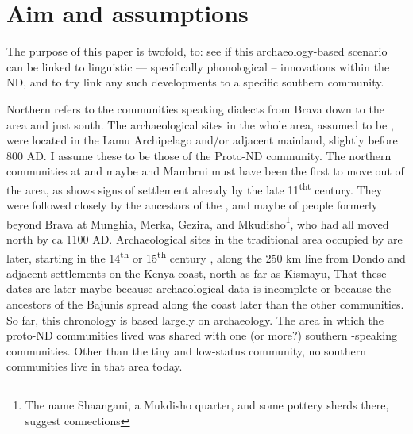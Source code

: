 \documentclass[output=paper
,newtxmath
,modfonts
,nonflat]{langsci/langscibook}
\begin{document}
\section{Aim and assumptions}\label{sec:nurse:3} 

The purpose of this paper is twofold, to: see if this archaeology-based scenario can be linked to linguistic --- specifically phonological -- innovations within the ND, and to try link any such developments to a specific southern  community. 

Northern  refers to the communities speaking  dialects from Brava down to the  area and just south. The archaeological sites in the whole area, assumed to be , were located in the Lamu Archipelago and/or adjacent mainland, slightly before 800 AD. I assume these to be those of the Proto-ND community. The northern communities at  and maybe  and Mambrui must have been the first to move out of the area, as  shows signs of  settlement already by the late 11\textsuperscript{th}\textsuperscript{t} century. They were followed closely by the ancestors of the , and maybe of people formerly beyond Brava at Munghia, Merka, Gezira, and Mkudisho\footnote{The name Shaangani, a Mukdisho quarter, and some pottery sherds there, suggest  connections}, who had all moved north by ca 1100 AD. Archaeological sites in the traditional area occupied by  are later, starting in the 14\textsuperscript{th} or 15\textsuperscript{th} century \citep[91]{Wilson1992}, along the 250 km line from Dondo and adjacent settlements on the Kenya coast, north as far as Kismayu, That these dates are later maybe because archaeological data is incomplete or because the ancestors of the Bajunis spread along the coast later than the other communities. So far, this chronology is based largely on archaeology. The area in which the proto-ND communities lived was shared with one (or more?) southern -speaking communities. Other than the tiny and low-status  community, no southern  communities live in that area today. 
\end{document}
